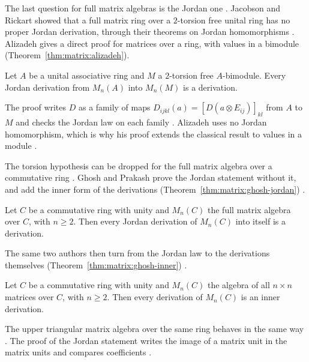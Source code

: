 The last question for full matrix algebras is the Jordan one
\cite[p.~574]{Alizadeh2009}. Jacobson and
Rickart showed that a full matrix ring over a $2$-torsion free unital ring has
no proper Jordan derivation, through their theorems on Jordan homomorphisms
\cite[p.~574]{Alizadeh2009}. Alizadeh gives a direct proof for matrices over a
ring, with values in a bimodule (Theorem~\ref{thm:matrix:alizadeh}).

\begin{theorem}\label{thm:matrix:alizadeh}
Let $A$ be a unital associative ring and $M$ a $2$-torsion free $A$-bimodule.
Every Jordan derivation from $M_n(A)$ into $M_n(M)$ is a derivation.
\end{theorem}

The proof writes $D$ as a family of maps $D_{ijkl}(a)=[D(a\otimes
E_{ij})]_{kl}$ from $A$ to $M$ and checks the Jordan law on each family
\cite[p.~575]{Alizadeh2009}. Alizadeh uses no Jordan homomorphism, which is
why his proof extends the classical result to values in a module
\cite[p.~575]{Alizadeh2009}. %

The torsion hypothesis can be dropped for the full matrix algebra over a
commutative ring \cite[p.~2]{GhoshPrakash2018}. Ghosh and Prakash prove the
Jordan statement without it, and add the inner form of the derivations (Theorem~\ref{thm:matrix:ghosh-jordan})
\cite[Theorem~3.2, p.~8]{GhoshPrakash2018}.\begin{theorem}\label{thm:matrix:ghosh-jordan}
Let $C$ be a commutative ring with unity and $M_n(C)$ the full matrix algebra
over $C$, with $n\geq2$. Then every Jordan derivation of $M_n(C)$ into itself
is a derivation.
\end{theorem}

The same two authors then turn from the Jordan law to the derivations
themselves (Theorem~\ref{thm:matrix:ghosh-inner})
\cite[p.~5]{GhoshPrakash2018}.

\begin{theorem}\label{thm:matrix:ghosh-inner}
Let $C$ be a commutative ring with unity and $M_n(C)$ the algebra of all
$n\times n$ matrices over $C$, with $n\geq2$. Then every derivation of $M_n(C)$
is an inner derivation.
\end{theorem}

The upper triangular matrix algebra over the same ring behaves in the same way
\cite[Theorem~2.1 and Theorem~2.2, pp.~3 and~5]{GhoshPrakash2018}. The proof
of the Jordan statement writes the image of a matrix unit in the matrix units
and compares coefficients \cite[pp.~5--8]{GhoshPrakash2018}.

